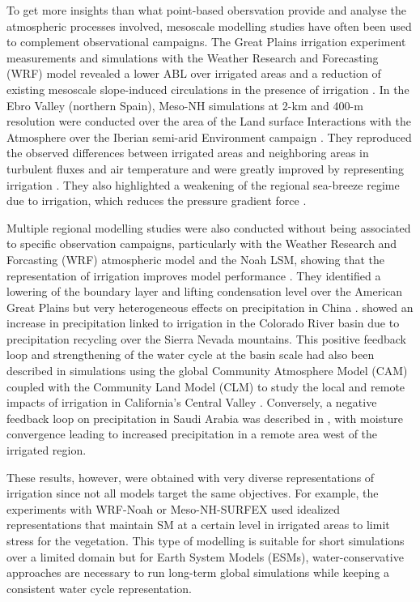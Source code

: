 To get more insights than what point-based obersvation provide and analyse the atmospheric processes involved, mesoscale modelling studies have often been used to complement observational campaigns. 
The Great Plains irrigation experiment \cite[GRAINEX,][]{rappin_great_2021} measurements and simulations with the Weather Research and Forecasting (WRF) model revealed a lower ABL over irrigated areas and a reduction of existing mesoscale slope-induced circulations in the presence of irrigation \citep{rappin_landatmosphere_2022, phillips_influence_2022}. 
In the Ebro Valley (northern Spain), Meso-NH simulations at 2-km and 400-m resolution were conducted over the area of the Land surface Interactions with the Atmosphere over the Iberian semi-arid Environment campaign \citep[LIAISE][]{boone_land_2019}. They reproduced the observed differences between irrigated areas and neighboring areas in turbulent fluxes and air temperature and were greatly improved by representing irrigation \citep{lunel_irrigation_2024}. They also highlighted a weakening of the regional sea-breeze regime due to irrigation, which reduces the pressure gradient force \citep{lunel_marinada_2024}.  

Multiple regional modelling studies were also conducted without being associated to specific observation campaigns, particularly with the Weather Research and Forcasting (WRF) atmospheric model and the Noah LSM, showing that the representation of irrigation improves model performance \citep{qian_modeling_2013, yang_impact_2017, liu_simulating_2021}. They identified a lowering of the boundary layer and lifting condensation level over the American Great Plains \citep{qian_modeling_2013} but very heterogeneous effects on precipitation in China \citep{liu_simulating_2021}. \citet{yang_impact_2017} showed an increase in precipitation linked to irrigation in the Colorado River basin due to precipitation recycling over the Sierra Nevada mountains. This positive feedback loop and strengthening of the water cycle at the basin scale had also been described in simulations using the global Community Atmosphere Model (CAM) coupled with the Community Land Model (CLM) to study the local and remote impacts of irrigation in California's Central Valley \citep{lo_irrigation_2013}. Conversely, a negative feedback loop on precipitation in Saudi Arabia was described in \citep{lo_intense_2021}, with moisture convergence leading to increased precipitation in a remote area west of the irrigated region.

These results, however, were obtained with very diverse representations of irrigation since not all models target the same objectives. For example, the experiments with WRF-Noah or Meso-NH-SURFEX \citep{lunel_irrigation_2024} used idealized representations that maintain SM at a certain level in irrigated areas to limit stress for the vegetation. This type of modelling is suitable for short simulations over a limited domain but for Earth System Models (ESMs), water-conservative approaches are necessary to run long-term global simulations while keeping a consistent water cycle representation.

